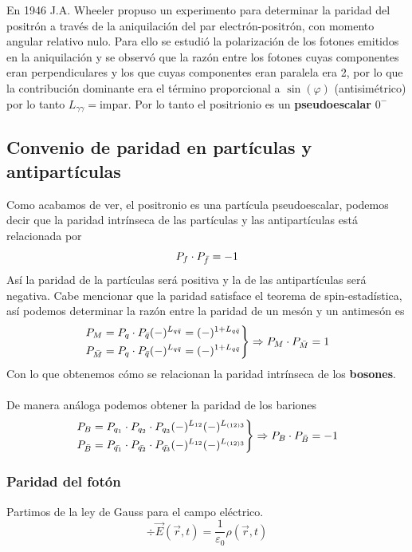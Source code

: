 \noindent En 1946 J.A. Wheeler propuso un experimento para determinar la paridad del positrón a través de la aniquilación del par electrón-positrón, con momento angular relativo nulo. Para ello se estudió la polarización de los fotones emitidos en la aniquilación y se observó que la razón entre los fotones cuyas componentes eran perpendiculares y los que cuyas componentes eran paralela era 2, por lo que la contribución dominante era el término proporcional a $\sin(\varphi)$ (antisimétrico) por lo tanto $L_{\gamma \gamma}=$impar. Por lo tanto el positrionio es un \textbf{pseudoescalar} $0^-$
\subsection{Convenio de paridad en partículas y antipartículas}
Como acabamos de ver, el positronio es una partícula pseudoescalar, podemos decir que la paridad intrínseca de las partículas y las antipartículas está relacionada por
\begin{equation}
    P_f\cdot P_{\Bar{f}}=-1
\end{equation}
Así la paridad de la partículas será positiva y la de las antipartículas será negativa. Cabe mencionar que la paridad satisface el teorema de spin-estadística, así podemos determinar la razón entre la paridad de un mesón y un antimesón es
\begin{equation}
    \left.\begin{aligned}
        &P_M=P_q\cdot P_{\Bar{q}} (-)^{L_{q\Bar{q}}}=(-)^{1+L_{q\Bar{q}}} \\
        &P_{\Bar{M}}=P_q\cdot P_{\Bar{q}} (-)^{L_{q\Bar{q}}}=(-)^{1+L_{q\Bar{q}}}
    \end{aligned} \right \} \Rightarrow P_M \cdot P_{\Bar{M}}=1
\end{equation}
Con lo que obtenemos cómo se relacionan la paridad intrínseca de los \textbf{bosones}.\\\\
De manera análoga podemos obtener la paridad de los bariones
\begin{equation}
        \left.\begin{aligned}
        &P_B=P_{q_1}\cdot P_{q_2} \cdot P_{q_3} (-)^{L_{12}} (-)^{L_{(12)3}} \\
        &P_{\Bar{B}}=P_{\Bar{q_1}}\cdot P_{\Bar{q_2}} \cdot P_{\Bar{q_3}} (-)^{L_{12}} (-)^{L_{(12)3}}
    \end{aligned} \right \} \Rightarrow P_B \cdot P_{\Bar{B}}=-1
\end{equation}
\subsubsection{Paridad del fotón}
Partimos de la ley de Gauss para el campo eléctrico.
\begin{equation}
\div \vec{E}(\vec{r},t)=\frac{1}{\varepsilon_0} \rho(\vec{r},t)
\label{eq: ley de gauss}
\end{equation}

